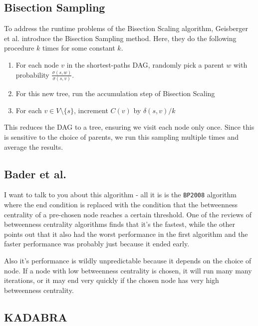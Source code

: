 \documentclass[a4paper,12pt]{article}
\begin{document}
\subsection{Bisection Sampling}

To address the runtime problems of the Bisection Scaling algorithm, Geisberger et al. introduce the Bisection Sampling method. Here, they do the following procedure $k$ times for some constant $k$.
\begin{enumerate}
\item For each node $v$ in the shortest-paths DAG, randomly pick a parent $w$ with probability $\frac{\sigma(s,w)}{\sigma(s,v)}$.
\item For this new tree, run the accumulation step of Bisection Scaling
\item For each $v \in V \setminus \{s\}$, increment $C(v)$ by $\delta(s,v)/k$
\end{enumerate}

This reduces the DAG to a tree, ensuring we visit each node only once. Since this is sensitive to the choice of parents, we run this sampling multiple times and average the results.

\subsection{Bader et al.}

I want to talk to you about this algorithm - all it is is the \texttt{BP2008} algorithm where the end condition is replaced with the condition that the betweenness centrality of a pre-chosen node reaches a certain threshold. One of the reviews of betweenness centrality algorithms finds that it's the fastest, while the other points out that it also had the worst performance in the first algorithm and the faster performance was probably just because it ended early.

Also it's performance is wildly unpredictable because it depends on the choice of node. If a node with low betweenness centrality is chosen, it will run many many iterations, or it may end very quickly if the chosen node has very high betweenness centrality.
\subsection{KADABRA}


\newpage


\end{document}
